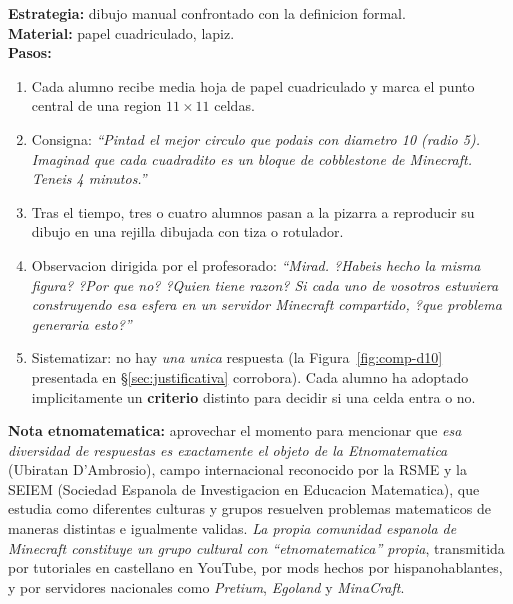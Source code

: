 \documentclass[12pt,a4paper]{scrartcl}
\newcommand{\acc}[1]{\textcolor{accent}{\textbf{#1}}}
\newcommand{\tempo}[1]{\textnormal{\footnotesize\color{bg!90!white}\textsf{#1}}}
\begin{document}
\begin{actividad}[1.2 --- Problematizacion \quad\tempo{15 min}]
\textbf{Estrategia:} dibujo manual confrontado con la definicion formal. \\[0.4em]
\textbf{Material:} papel cuadriculado, lapiz. \\[0.4em]
\textbf{Pasos:}
\begin{enumerate}[leftmargin=1.5em,itemsep=0.2em,topsep=0.3em,nosep]
  \item Cada alumno recibe media hoja de papel cuadriculado y marca el punto central de una region $11 \times 11$ celdas.
  \item Consigna: \emph{\enquote{Pintad el mejor circulo que podais con diametro 10 (radio 5). \emph{Imaginad que cada cuadradito es un bloque de cobblestone de Minecraft.} Teneis 4 minutos.}}
  \item Tras el tiempo, tres o cuatro alumnos pasan a la pizarra a reproducir su dibujo en una rejilla dibujada con tiza o rotulador.
  \item Observacion dirigida por el profesorado: \emph{\enquote{Mirad. ?Habeis hecho la misma figura? ?Por que no? ?Quien tiene razon? Si cada uno de vosotros estuviera construyendo esa esfera en un servidor Minecraft compartido, ?que problema generaria esto?}}
  \item Sistematizar: no hay \emph{una unica} respuesta (la Figura~\ref{fig:comp-d10} presentada en §\ref{sec:justificativa} corrobora). Cada alumno ha adoptado implicitamente un \acc{criterio} distinto para decidir si una celda entra o no.
\end{enumerate}

\textbf{Nota etnomatematica:} aprovechar el momento para mencionar que \emph{esa diversidad de respuestas es exactamente el objeto de la Etnomatematica} (Ubiratan D'Ambrosio), campo internacional reconocido por la RSME y la SEIEM (Sociedad Espanola de Investigacion en Educacion Matematica), que estudia como diferentes culturas y grupos resuelven problemas matematicos de maneras distintas e igualmente validas. \emph{La propia comunidad espanola de Minecraft constituye un grupo cultural con \enquote{etnomatematica} propia}, transmitida por tutoriales en castellano en YouTube, por mods hechos por hispanohablantes, y por servidores nacionales como \emph{Pretium}, \emph{Egoland} y \emph{MinaCraft}.
\end{actividad}
\end{document}
